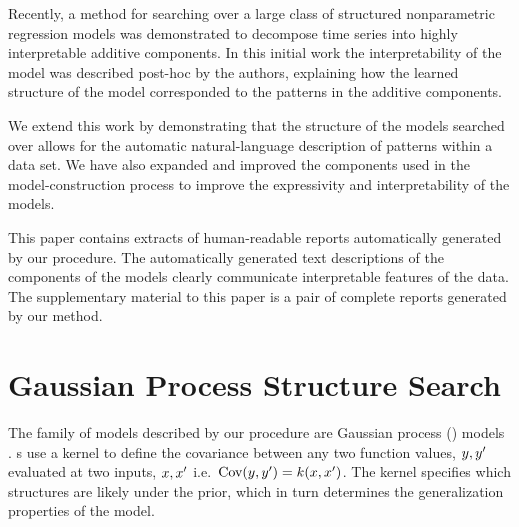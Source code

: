 \documentclass{article} %
\def\ie{i.e.\ }
\begin{document}
Recently, a method for searching over a large class of structured nonparametric regression models \citep{DuvLloGroetal13} was demonstrated to decompose time series into highly interpretable additive components.
In this initial work the interpretability of the model was described post-hoc by the authors, explaining how the learned structure of the model corresponded to the patterns in the additive components.

We extend this work by demonstrating that the structure of the models searched over allows for the automatic natural-language description of patterns within a data set.
We have also expanded and improved the components used in the model-construction process to improve the expressivity and interpretability of the models.

This paper contains extracts of human-readable reports automatically generated by our procedure.
The automatically generated text descriptions of the components of the models clearly communicate interpretable features of the data.
The supplementary material to this paper is a pair of complete reports generated by our method.



\section{Gaussian Process Structure Search}
\label{sec:gpss}
\vspace{-0.1in}

The family of models described by our procedure are Gaussian process (\gp{}) models \cite{rasmussen38gaussian}.
%
\gp{}s use a kernel to define the covariance between any two function values, $y, y'$ evaluated at two inputs, $x,x'$ \ie ${\textrm{Cov}(y, y') = k(x,x')}$.
The kernel specifies which structures are likely under the \gp{} prior, which in turn determines the generalization properties of the model.
\end{document}

